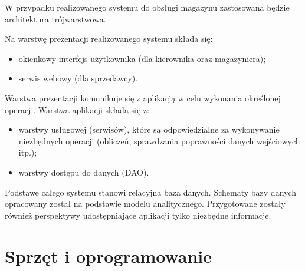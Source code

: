 W przypadku realizowanego systemu do obsługi magazynu zastosowana
będzie architektura trójwarstwowa.

Na warstwę prezentacji realizowanego systemu składa się:
\begin{itemize}
\item okienkowy interfejs użytkownika (dla kierownika oraz
  magazyniera);
\item serwis webowy (dla sprzedawcy).
\end{itemize}
Warstwa prezentacji komunikuje się z aplikacją w celu wykonania
określonej operacji. Warstwa aplikacji składa się z:
\begin{itemize}
\item warstwy usługowej (serwisów), które są odpowiedzialne za 
  wykonywanie niezbędnych operacji (obliczeń, sprawdzania poprawności
  danych wejściowych itp.);
\item warstwy dostępu do danych (DAO).
\end{itemize}

Podstawę całego systemu stanowi relacyjna baza danych.
Schematy bazy danych opracowany został na podstawie 
modelu analitycznego. Przygotowane zostały również
perspektywy udostępniające aplikacji tylko niezbędne
informacje.

\section{Sprzęt i oprogramowanie}



